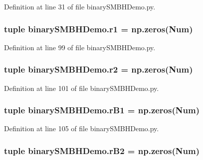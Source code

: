 Definition at line 31 of file binary\-S\-M\-B\-H\-Demo.\-py.

\hypertarget{namespacebinary_s_m_b_h_demo_afa2c1a69396867f79d8fa488b78a5d4a}{
\subsubsection[{r1}]{\setlength{\rightskip}{0pt plus 5cm}tuple binary\-S\-M\-B\-H\-Demo.\-r1 = np.\-zeros({\bf Num})}}\label{namespacebinary_s_m_b_h_demo_afa2c1a69396867f79d8fa488b78a5d4a}


Definition at line 99 of file binary\-S\-M\-B\-H\-Demo.\-py.

\hypertarget{namespacebinary_s_m_b_h_demo_a8492099467bf0c8cdeea92c96d291d72}{
\subsubsection[{r2}]{\setlength{\rightskip}{0pt plus 5cm}tuple binary\-S\-M\-B\-H\-Demo.\-r2 = np.\-zeros({\bf Num})}}\label{namespacebinary_s_m_b_h_demo_a8492099467bf0c8cdeea92c96d291d72}


Definition at line 101 of file binary\-S\-M\-B\-H\-Demo.\-py.

\hypertarget{namespacebinary_s_m_b_h_demo_a5fc5c18e9e789a0bab0d94067a4f9636}{
\subsubsection[{r\-B1}]{\setlength{\rightskip}{0pt plus 5cm}tuple binary\-S\-M\-B\-H\-Demo.\-r\-B1 = np.\-zeros({\bf Num})}}\label{namespacebinary_s_m_b_h_demo_a5fc5c18e9e789a0bab0d94067a4f9636}


Definition at line 105 of file binary\-S\-M\-B\-H\-Demo.\-py.

\hypertarget{namespacebinary_s_m_b_h_demo_a7d9134aac5e5106450b092ab423b890f}{
\subsubsection[{r\-B2}]{\setlength{\rightskip}{0pt plus 5cm}tuple binary\-S\-M\-B\-H\-Demo.\-r\-B2 = np.\-zeros({\bf Num})}}\label{namespacebinary_s_m_b_h_demo_a7d9134aac5e5106450b092ab423b890f}


